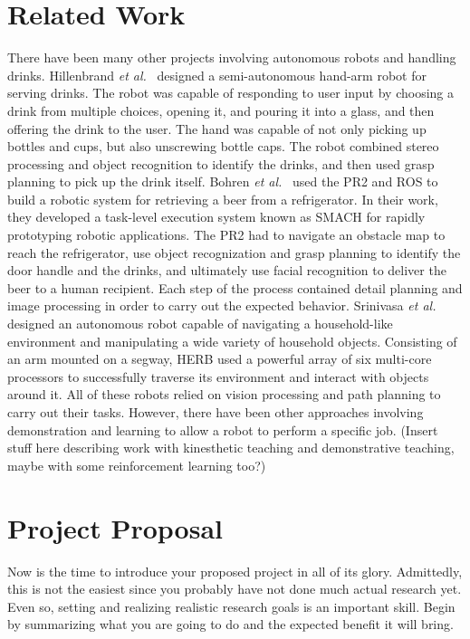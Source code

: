 \documentclass{sig-alternate}
\begin{document}
\section{Related Work}
\label{sec:related_work}
There have been many other projects involving autonomous robots and handling drinks. Hillenbrand \textit{et al.}~\cite{pouring_arm} designed a semi-autonomous hand-arm robot for serving drinks. The robot was capable of responding to user input by choosing a drink from multiple choices, opening it, and pouring it into a glass, and then offering the drink to the user. The hand was capable of not only picking up bottles and cups, but also unscrewing bottle caps. The robot combined stereo processing and object recognition to identify the drinks, and then used grasp planning to pick up the drink itself. Bohren \textit{et al.}~\cite{beer} used the PR2 and ROS to build a robotic system for retrieving a beer from a refrigerator. In their work, they developed a task-level execution system known as SMACH for rapidly prototyping robotic applications. The PR2 had to navigate an obstacle map to reach the refrigerator, use object recognization and grasp planning to identify the door handle and the drinks, and ultimately use facial recognition to deliver the beer to a human recipient. Each step of the process contained detail planning and image processing in order to carry out the expected behavior. Srinivasa \textit{et al.}~\cite{herb} designed an autonomous robot capable of navigating a household-like environment and manipulating a wide variety of household objects. Consisting of an arm mounted on a segway, HERB used a powerful array of six multi-core processors to successfully traverse its environment and interact with objects around it.
All of these robots relied on vision processing and path planning to carry out their tasks. However, there have been other approaches involving demonstration and learning to allow a robot to perform a specific job. (Insert stuff here describing work with kinesthetic teaching and demonstrative teaching, maybe with some reinforcement learning too?)

\section{Project Proposal}
\label{sec:project_proposal}
Now is the time to introduce your proposed project in all of its glory. Admittedly, this is not the easiest since you probably have not done much actual research yet. Even so, setting and realizing realistic research goals is an important skill. Begin by summarizing what you are going to do and the expected benefit it will bring.
\end{document}
